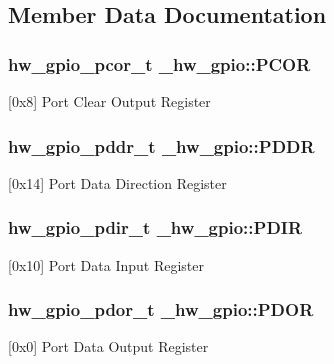 \subsection{Member Data Documentation}
\subsubsection[{\texorpdfstring{P\+C\+OR}{PCOR}}]{ {\bf hw\+\_\+gpio\+\_\+pcor\+\_\+t} \+\_\+hw\+\_\+gpio\+::\+P\+C\+OR}\hypertarget{struct__hw__gpio_ae9511cfe5234bc80b58bddf925a48212}{}\label{struct__hw__gpio_ae9511cfe5234bc80b58bddf925a48212}
\mbox{[}0x8\mbox{]} Port Clear Output Register 
\subsubsection[{\texorpdfstring{P\+D\+DR}{PDDR}}]{ {\bf hw\+\_\+gpio\+\_\+pddr\+\_\+t} \+\_\+hw\+\_\+gpio\+::\+P\+D\+DR}\hypertarget{struct__hw__gpio_a65ef737933f5ea56596ef09cb1933287}{}\label{struct__hw__gpio_a65ef737933f5ea56596ef09cb1933287}
\mbox{[}0x14\mbox{]} Port Data Direction Register 
\subsubsection[{\texorpdfstring{P\+D\+IR}{PDIR}}]{ {\bf hw\+\_\+gpio\+\_\+pdir\+\_\+t} \+\_\+hw\+\_\+gpio\+::\+P\+D\+IR}\hypertarget{struct__hw__gpio_a199310f790666e9317d2528a05b42b88}{}\label{struct__hw__gpio_a199310f790666e9317d2528a05b42b88}
\mbox{[}0x10\mbox{]} Port Data Input Register 
\subsubsection[{\texorpdfstring{P\+D\+OR}{PDOR}}]{ {\bf hw\+\_\+gpio\+\_\+pdor\+\_\+t} \+\_\+hw\+\_\+gpio\+::\+P\+D\+OR}\hypertarget{struct__hw__gpio_a3d25308877e6a5c18654141ad515639f}{}\label{struct__hw__gpio_a3d25308877e6a5c18654141ad515639f}
\mbox{[}0x0\mbox{]} Port Data Output Register 
